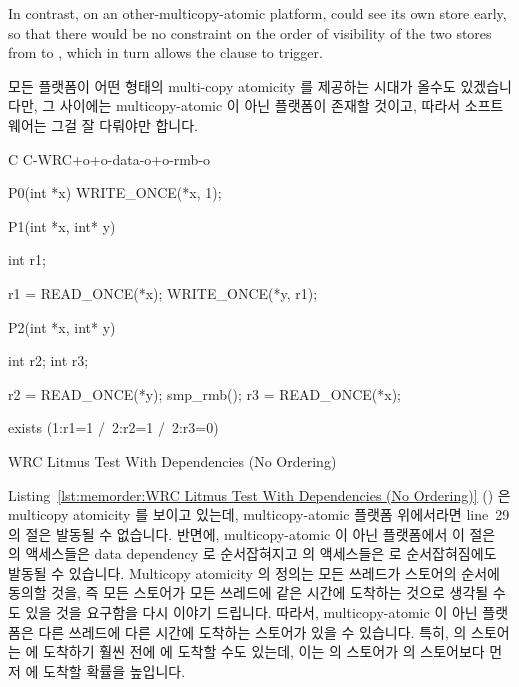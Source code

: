 {	In contrast, on an other-multicopy-atomic platform, 
	could see its own store early, so that there would be no constraint
	on the order of visibility of the two stores from to ,
	which in turn allows the  clause to trigger.
	\fi
} \QuickQuizEnd

모든 플랫폼이 어떤 형태의 multi-copy atomicity 를 제공하는 시대가 올수도
있겠습니다만, 그 사이에는 multicopy-atomic 이 아닌 플랫폼이 존재할 것이고,
따라서 소프트웨어는 그걸 잘 다뤄야만 합니다.

\begin{listing}[tbp]
{ \scriptsize
\begin{verbbox}[\LstLineNo]
C C-WRC+o+o-data-o+o-rmb-o

{
}

P0(int *x)
{
  WRITE_ONCE(*x, 1);
}

P1(int *x, int* y)
{
  int r1;

  r1 = READ_ONCE(*x);
  WRITE_ONCE(*y, r1);
}

P2(int *x, int* y)
{
  int r2;
  int r3;

  r2 = READ_ONCE(*y);
  smp_rmb();
  r3 = READ_ONCE(*x);
}

exists (1:r1=1 /\ 2:r2=1 /\ 2:r3=0)
\end{verbbox}
}
\centering
\theverbbox
\caption{WRC Litmus Test With Dependencies (No Ordering)}
\label{lst:memorder:WRC Litmus Test With Dependencies (No Ordering)}
\end{listing}

Listing~\ref{lst:memorder:WRC Litmus Test With Dependencies (No Ordering)}
()
은 multicopy atomicity 를 보이고 있는데, multicopy-atomic 플랫폼 위에서라면
line~29 의  절은 발동될 수 없습니다.
반면에, multicopy-atomic 이 아닌 플랫폼에서 이  절은  의
액세스들은 data dependency 로 순서잡혀지고  의 액세스들은
 로 순서잡혀짐에도 발동될 수 있습니다.
Multicopy atomicity 의 정의는 모든 쓰레드가 스토어의 순서에 동의할 것을, 즉
모든 스토어가 모든 쓰레드에 같은 시간에 도착하는 것으로 생각될 수도 있을 것을
요구함을 다시 이야기 드립니다.
따라서, multicopy-atomic 이 아닌 플랫폼은 다른 쓰레드에 다른 시간에 도착하는
스토어가 있을 수 있습니다.
특히,  의 스토어는  에 도착하기 훨씬 전에  에 도착할
수도 있는데, 이는  의 스토어가  의 스토어보다 먼저 
에 도착할 확률을 높입니다.
\iffalse


